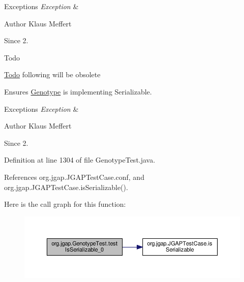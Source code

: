 \begin{DoxyExceptions}{Exceptions}
{\em Exception} & \\
\hline
\end{DoxyExceptions}
\begin{DoxyAuthor}{Author}
Klaus Meffert 
\end{DoxyAuthor}
\begin{DoxySince}{Since}
2.
\end{DoxySince}
\begin{DoxyRefDesc}{Todo}
\item[\hyperlink{todo__todo000187}{Todo}]following will be obsolete \end{DoxyRefDesc}
Ensures \hyperlink{classorg_1_1jgap_1_1_genotype}{Genotype} is implementing Serializable. 
\begin{DoxyExceptions}{Exceptions}
{\em Exception} & \\
\hline
\end{DoxyExceptions}
\begin{DoxyAuthor}{Author}
Klaus Meffert 
\end{DoxyAuthor}
\begin{DoxySince}{Since}
2. 
\end{DoxySince}


Definition at line 1304 of file Genotype\-Test.\-java.



References org.\-jgap.\-J\-G\-A\-P\-Test\-Case.\-conf, and org.\-jgap.\-J\-G\-A\-P\-Test\-Case.\-is\-Serializable().



Here is the call graph for this function\-:
\nopagebreak
\begin{figure}[H]
\begin{center}
\leavevmode
\includegraphics[width=350pt]{classorg_1_1jgap_1_1_genotype_test_aa0d1c56bf7ef0e020f3d979f784dc5d3_cgraph}
\end{center}
\end{figure}


